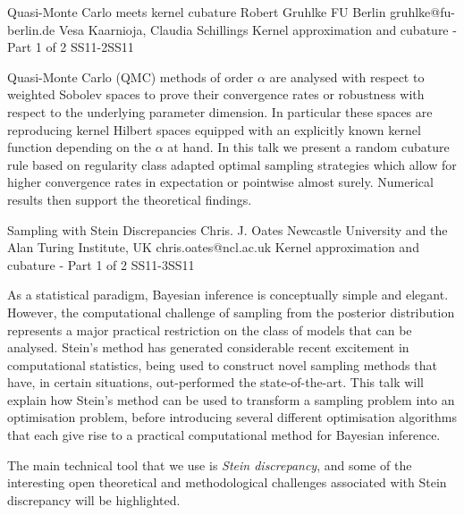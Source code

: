 \begin{talk}
  {Quasi-Monte Carlo meets kernel cubature}%
  {Robert Gruhlke}%
  {FU Berlin}%
  {gruhlke@fu-berlin.de}%
  {Vesa Kaarnioja, Claudia Schillings}%
{Kernel approximation and cubature - Part 1 of 2}
{}{SS11-2}{SS11}


Quasi-Monte Carlo (QMC) methods of order $\alpha$ are analysed with respect to weighted Sobolev spaces to prove their convergence rates or robustness with respect to the underlying parameter dimension. In particular these spaces are reproducing kernel Hilbert spaces equipped with an explicitly known kernel function depending on the $\alpha$ at hand. In this talk we present a random cubature rule based on regularity class adapted optimal sampling strategies which allow for higher convergence rates in expectation or pointwise almost surely. Numerical results then support the theoretical findings.
\end{talk}

\begin{talk}
  {Sampling with Stein Discrepancies}%
  {Chris. J. Oates}%
  {Newcastle University and the Alan Turing Institute, UK}%
  {chris.oates@ncl.ac.uk}%
  {}%
{Kernel approximation and cubature - Part 1 of 2}
{}{SS11-3}{SS11}


As a statistical paradigm, Bayesian inference is conceptually simple and elegant.  However, the computational challenge of sampling from the posterior distribution represents a major practical restriction on the class of models that can be analysed.  Stein's method has generated considerable recent excitement in computational statistics, being used to construct novel sampling methods that have, in certain situations, out-performed the state-of-the-art.  This talk will explain how Stein's method can be used to transform a sampling problem into an optimisation problem, before introducing several different optimisation algorithms that each give rise to a practical computational method for Bayesian inference.

The main technical tool that we use is \emph{Stein discrepancy}, and some of the interesting open theoretical and methodological challenges associated with Stein discrepancy will be highlighted.
\end{talk}

